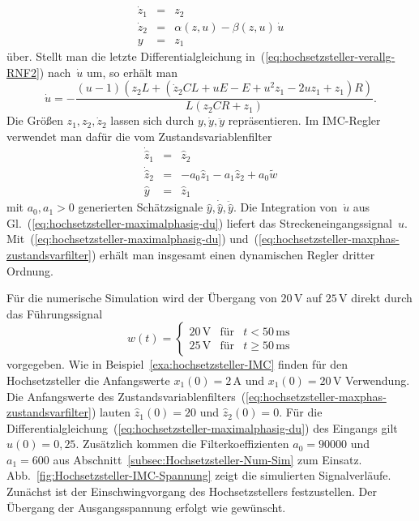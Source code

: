 \begin{example}
\begin{equation}
\begin{array}{lcl}
\dot{z}_{1} & = & z_{2}\\
\dot{z}_{2} & = & \alpha(z,u)-\beta(z,u)\,\dot{u}\\
y & = & z_{1}
\end{array}\label{eq:hochsetzsteller-verallg-RNF2}
\end{equation}
über. Stellt man die letzte Differentialgleichung in~(\ref{eq:hochsetzsteller-verallg-RNF2})
nach~$\dot{u}$ um, so erhält man 
\begin{equation}
\dot{u}=-\frac{\left(u-1\right)\left(z_{2}L+\left(\dot{z}_{2}CL+uE-E+u^{2}z_{1}-2uz_{1}+z_{1}\right)R\right)}{L\left(z_{2}CR+z_{1}\right)}.\label{eq:hochsetzsteller-maximalphasig-du}
\end{equation}
Die Größen $z_{1},z_{2},\dot{z}_{2}$ lassen sich durch $y,\dot{y},\ddot{y}$
repräsentieren. Im IMC-Regler verwendet man dafür die vom Zustandsvariablenfilter
\begin{equation}
\begin{array}{lcl}
\dot{\hat{z}}_{1} & = & \hat{z}_{2}\\
\dot{\hat{z}}_{2} & = & -a_{0}\hat{z}_{1}-a_{1}\hat{z}_{2}+a_{0}\tilde{w}\\
\hat{y} & = & \hat{z}_{1}
\end{array}\label{eq:hochsetzsteller-maxphas-zustandsvarfilter}
\end{equation}
mit $a_{0},a_{1}>0$ generierten Schätzsignale $\hat{y},\dot{\hat{y}},\ddot{\hat{y}}$.
Die Integration von~$\dot{u}$ aus Gl.~(\ref{eq:hochsetzsteller-maximalphasig-du})
liefert das Streckeneingangssignal~$u$. Mit~(\ref{eq:hochsetzsteller-maximalphasig-du})
und~(\ref{eq:hochsetzsteller-maxphas-zustandsvarfilter}) erhält
man insgesamt einen dynamischen Regler dritter Ordnung.

Für die numerische Simulation wird der Übergang von $20\,\text{V}$
auf $25\,\text{V}$ direkt durch das Führungssignal 
\[
w(t)=\left\{ \begin{array}{rcl}
20\,\text{V} & \text{für} & t<50\,\text{ms}\\
25\,\text{V} & \text{für} & t\geq50\,\text{ms}
\end{array}\right.
\]
vorgegeben. Wie in Beispiel~\ref{exa:hochsetzsteller-IMC} finden
für den Hochsetzsteller die Anfangswerte $x_{1}(0)=2\,\text{A}$ und
$x_{1}(0)=20\,\text{V}$ Verwendung. Die Anfangswerte des Zustandsvariablenfilters~(\ref{eq:hochsetzsteller-maxphas-zustandsvarfilter})
lauten $\hat{z}_{1}(0)=20$ und $\hat{z}_{2}(0)=0$. Für die Differentialgleichung~(\ref{eq:hochsetzsteller-maximalphasig-du})
des Eingangs gilt $u(0)=0,25$. Zusätzlich kommen die Filterkoeffizienten
$a_{0}=90000$ und $a_{1}=600$ aus Abschnitt~\ref{subsec:Hochsetzsteller-Num-Sim}
zum Einsatz. Abb.~\ref{fig:Hochsetzsteller-IMC-Spannung} zeigt die
simulierten Signalverläufe. Zunächst ist der Einschwingvorgang des
Hochsetzstellers festzustellen. Der Übergang der Ausgangsspannung
erfolgt wie gewünscht.
\end{example}
